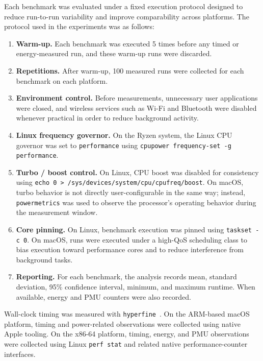 \documentclass{tcsa}
\begin{document}
Each benchmark was evaluated under a fixed execution protocol designed to reduce
run-to-run variability and improve comparability across platforms. The protocol
used in the experiments was as follows:

\begin{enumerate}
    \item \textbf{Warm-up.} Each benchmark was executed 5 times before any timed
    or energy-measured run, and these warm-up runs were discarded.
    \item \textbf{Repetitions.} After warm-up, 100 measured runs were collected
    for each benchmark on each platform.
    \item \textbf{Environment control.} Before measurements, unnecessary user
    applications were closed, and wireless services such as Wi-Fi and Bluetooth
    were disabled whenever practical in order to reduce background activity.
    \item \textbf{Linux frequency governor.} On the Ryzen system, the Linux CPU
    governor was set to \texttt{performance} using
    \texttt{cpupower frequency-set -g performance}.
    \item \textbf{Turbo / boost control.} On Linux, CPU boost was disabled for
    consistency using \texttt{echo 0 > /sys/devices/system/cpu/cpufreq/boost}.
    On macOS, turbo behavior is not directly user-configurable in the same way;
    instead, \texttt{powermetrics} was used to observe the processor's operating
    behavior during the measurement window.
    \item \textbf{Core pinning.} On Linux, benchmark execution was pinned using
    \texttt{taskset -c 0}. On macOS, runs were executed under a high-QoS
    scheduling class to bias execution toward performance cores and to reduce
    interference from background tasks.
    \item \textbf{Reporting.} For each benchmark, the analysis records mean,
    standard deviation, 95\% confidence interval, minimum, and maximum runtime.
    When available, energy and PMU counters were also recorded.
\end{enumerate}

Wall-clock timing was measured with \texttt{hyperfine}~\cite{hyperfine}. On the
ARM-based macOS platform, timing and power-related observations were collected
using native Apple tooling. On the x86-64 platform, timing, energy, and PMU
observations were collected using Linux \texttt{perf stat} and related native
performance-counter interfaces.
\end{document}
